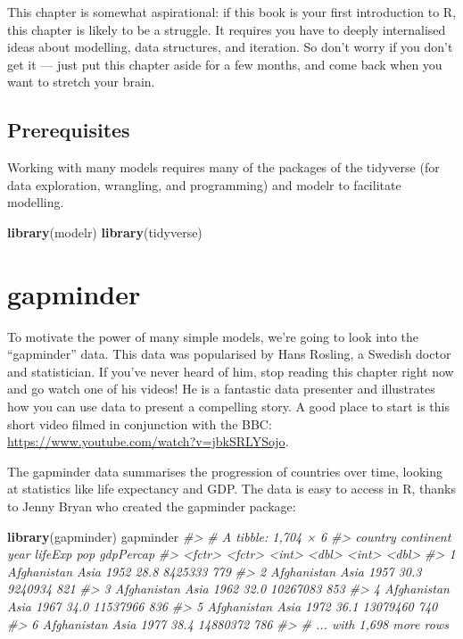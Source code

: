 \documentclass[]{book}
\newenvironment{Shaded}{\begin{snugshade}}{\end{snugshade}}
\newcommand{\KeywordTok}[1]{\textcolor[rgb]{0.13,0.29,0.53}{\textbf{{#1}}}}
\newcommand{\CommentTok}[1]{\textcolor[rgb]{0.56,0.35,0.01}{\textit{{#1}}}}
\newcommand{\NormalTok}[1]{{#1}}
\begin{document}
This chapter is somewhat aspirational: if this book is your first
introduction to R, this chapter is likely to be a struggle. It requires
you have to deeply internalised ideas about modelling, data structures,
and iteration. So don't worry if you don't get it --- just put this
chapter aside for a few months, and come back when you want to stretch
your brain.

\subsection{Prerequisites}\label{prerequisites-17}

Working with many models requires many of the packages of the tidyverse
(for data exploration, wrangling, and programming) and modelr to
facilitate modelling.

\begin{Shaded}
\begin{Highlighting}[]
\KeywordTok{library}\NormalTok{(modelr)}
\KeywordTok{library}\NormalTok{(tidyverse)}
\end{Highlighting}
\end{Shaded}

\section{gapminder}\label{gapminder}

To motivate the power of many simple models, we're going to look into
the ``gapminder'' data. This data was popularised by Hans Rosling, a
Swedish doctor and statistician. If you've never heard of him, stop
reading this chapter right now and go watch one of his videos! He is a
fantastic data presenter and illustrates how you can use data to present
a compelling story. A good place to start is this short video filmed in
conjunction with the BBC:
\url{https://www.youtube.com/watch?v=jbkSRLYSojo}.

The gapminder data summarises the progression of countries over time,
looking at statistics like life expectancy and GDP. The data is easy to
access in R, thanks to Jenny Bryan who created the gapminder package:

\begin{Shaded}
\begin{Highlighting}[]
\KeywordTok{library}\NormalTok{(gapminder)}
\NormalTok{gapminder}
\CommentTok{#> # A tibble: 1,704 × 6}
\CommentTok{#>       country continent  year lifeExp      pop gdpPercap}
\CommentTok{#>        <fctr>    <fctr> <int>   <dbl>    <int>     <dbl>}
\CommentTok{#> 1 Afghanistan      Asia  1952    28.8  8425333       779}
\CommentTok{#> 2 Afghanistan      Asia  1957    30.3  9240934       821}
\CommentTok{#> 3 Afghanistan      Asia  1962    32.0 10267083       853}
\CommentTok{#> 4 Afghanistan      Asia  1967    34.0 11537966       836}
\CommentTok{#> 5 Afghanistan      Asia  1972    36.1 13079460       740}
\CommentTok{#> 6 Afghanistan      Asia  1977    38.4 14880372       786}
\CommentTok{#> # ... with 1,698 more rows}
\end{Highlighting}
\end{Shaded}
\end{document}
